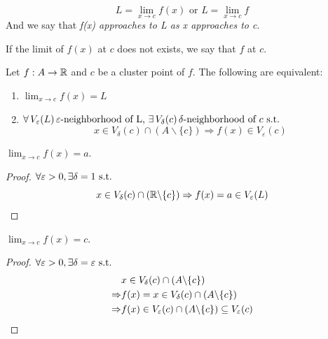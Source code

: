 \documentclass[a4paper,12pt]{article}
\begin{document}
\begin{notation}
    \[L=\lim_{x\rightarrow c}f(x)\text{ or } L=\lim_{x\rightarrow c}f\]
    And we say that \textit{f(x) approaches to L as x approaches to c}.\\
\end{notation}

\begin{remark}
    If the limit of \(f(x)\) at \(c\) does not exists, we say that \(f\)  at \(c\).\\
\end{remark}

\begin{theorem}
    Let \(f:A\rightarrow \mathbb{R}\) and \(c \) be a cluster point of \(f \). The following are equivalent:
    \begin{enumerate}
        \item \(\lim_{x\rightarrow c }f(x)=L\)
        \item \(\forall\, V_\varepsilon(L)\,\varepsilon\text{-neighborhood of L, }\exists\, V_\delta(c)\,\delta\text{-neighborhood of }c\text{ s.t. }\)
        \[x\in V_\delta(c)\cap (A\backslash\{c\})\Rightarrow f(x)\in V_\varepsilon(c)\]
    \end{enumerate}
\end{theorem}

\begin{example}
    \(\lim_{x\rightarrow c}f(x)=a\).
    \begin{proof}
        \(\forall \varepsilon>0, \exists\delta=1\text{ s.t. }\)
        \[x\in V_{\delta}{(c)}\cap(\mathbb{R}\backslash\{c\})\Rightarrow f(x)=a\in V_{\varepsilon}{(L)}\]
    \end{proof}
\end{example}

\begin{example}
    \(\lim_{x\rightarrow c}f(x)=c\).
    \begin{proof}
        \(\forall \varepsilon>0,\exists \delta=\varepsilon\text{ s.t. }\)
        \begin{align*}
            &x\in V_{\delta }{(c )}\cap (A\backslash\{c \})\\
            \Rightarrow& f(x)=x\in V_{\delta }{(c )}\cap(A\backslash\{c \})\\
            \Rightarrow&f(x)\in V_{\varepsilon }{(c )}\cap(A\backslash\{c \})\subseteq V_{\varepsilon }{(c )}
        \end{align*}
        
    \end{proof}
\end{example}
\end{document}
